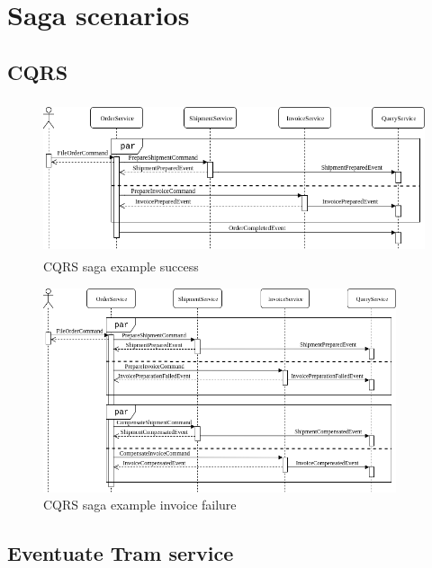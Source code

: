 \documentclass[oneside,
  digital, %
  table,   %
  lof,     %
  lot,     %
]{fithesis3}
\begin{document}
\clearpage
\chapter{Saga scenarios}
\label{sec:appendix-scenarios}

\section{CQRS}

\begin{figure}[h]
    \begin{center}
        \includegraphics[height=45mm]{images/sequence/validSagaCQRS.png}
    \end{center}
    \caption{CQRS saga example success}
\end{figure}

\hfill \break

\begin{figure}[h]
    \begin{center}
        \includegraphics[height=60mm]{images/sequence/invoiceFailSagaCQRS.png}
    \end{center}
    \caption{CQRS saga example invoice failure}
\end{figure}

\section{Eventuate Tram service}
\end{document}
